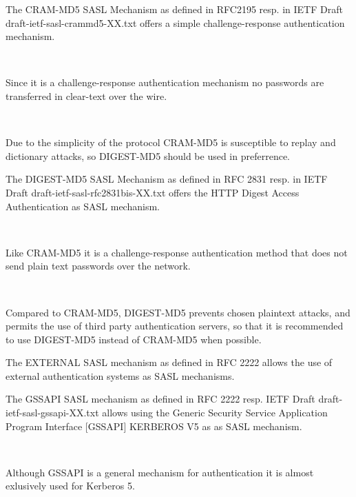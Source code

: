 \documentclass[]{article}
\begin{document}
\begin{description}
\itemsep1pt\parskip0pt
\item[CRAM-MD5]
The CRAM-MD5 SASL Mechanism as defined in RFC2195 resp. in IETF Draft
draft-ietf-sasl-crammd5-XX.txt offers a simple challenge-response
authentication mechanism.

~

Since it is a challenge-response authentication mechanism no passwords
are transferred in clear-text over the wire.

~

Due to the simplicity of the protocol CRAM-MD5 is susceptible to replay
and dictionary attacks, so DIGEST-MD5 should be used in preferrence.
\end{description}

\begin{description}
\itemsep1pt\parskip0pt
\item[DIGEST-MD5]
The DIGEST-MD5 SASL Mechanism as defined in RFC 2831 resp. in IETF Draft
draft-ietf-sasl-rfc2831bis-XX.txt offers the HTTP Digest Access
Authentication as SASL mechanism.

~

Like CRAM-MD5 it is a challenge-response authentication method that does
not send plain text passwords over the network.

~

Compared to CRAM-MD5, DIGEST-MD5 prevents chosen plaintext attacks, and
permits the use of third party authentication servers, so that it is
recommended to use DIGEST-MD5 instead of CRAM-MD5 when possible.
\end{description}

\begin{description}
\itemsep1pt\parskip0pt
\item[EXTERNAL]
The EXTERNAL SASL mechanism as defined in RFC 2222 allows the use of
external authentication systems as SASL mechanisms.
\end{description}

\begin{description}
\itemsep1pt\parskip0pt
\item[GSSAPI]
The GSSAPI SASL mechanism as defined in RFC 2222 resp. IETF Draft
draft-ietf-sasl-gssapi-XX.txt allows using the Generic Security Service
Application Program Interface {[}GSSAPI{]} KERBEROS V5 as as SASL
mechanism.

~

Although GSSAPI is a general mechanism for authentication it is almost
exlusively used for Kerberos 5.
\end{description}
\end{document}

